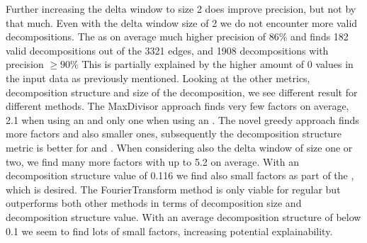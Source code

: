 Further increasing the delta window to size 2 does improve precision, but not by that much.
Even with the delta window size of 2 we do not encounter more valid decompositions.
The \andDecomp as on average much higher precision of 86\% and finds 182 valid decompositions out of the 3321 edges, and 1908 decompositions with precision $\geq 90\%$
This is partially explained by the higher amount of 0 values in the input data as previously mentioned.
Looking at the other metrics, decomposition structure and size of the decomposition, we see different result for different methods.
The MaxDivisor approach finds very few factors on average, 2.1 when using an \andDecomp and only one when using an \orDecomp.
The novel greedy approach finds more factors and also smaller ones, subsequently the decomposition structure metric is better for \andDecomp and \orDecomp.
When considering also the delta window of size one or two, we find many more factors with up to 5.2 on average.
With an decomposition structure value of 0.116 we find also small factors as part of the \orDecomp, which is desired.
The FourierTransform method is only viable for regular \orDecomp but outperforms both other methods in terms of decomposition size and decomposition structure value.
With an average decomposition structure of below 0.1 we seem to find lots of small factors, increasing potential explainability.



